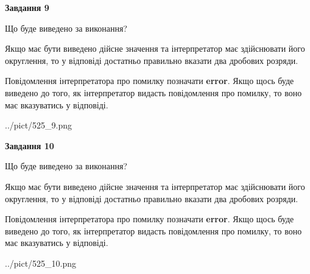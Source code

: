 \documentclass[12pt, ukrainian]{article}
\begin{document}
{\begin {Large}
{\begin {center}\textbf{Завдання 9}\end {center}}\par
Що буде виведено за виконання? \par

Якщо має бути виведено дійсне значення та інтерпретатор має здійснювати його округлення, 
то у відповіді достатньо правильно вказати два дробових розряди.

Повідомлення інтерпретатора про помилку позначати \textbf{error}.
Якщо щось буде виведено до того, як інтерпретатор видасть повідомлення про помилку, 
то воно має вказуватись у відповіді. \par

\begin{center}
	{../pict/525_9.png}
\end{center}
\newpage

{\begin {center}\textbf{Завдання 10}\end {center}}\par
Що буде виведено за виконання? \par

Якщо має бути виведено дійсне значення та інтерпретатор має здійснювати його округлення, 
то у відповіді достатньо правильно вказати два дробових розряди.

Повідомлення інтерпретатора про помилку позначати \textbf{error}.
Якщо щось буде виведено до того, як інтерпретатор видасть повідомлення про помилку, 
то воно має вказуватись у відповіді. \par

\begin{center}
	{../pict/525_10.png}
\end{center}
\newpage

\end {Large}}
\end{document}
